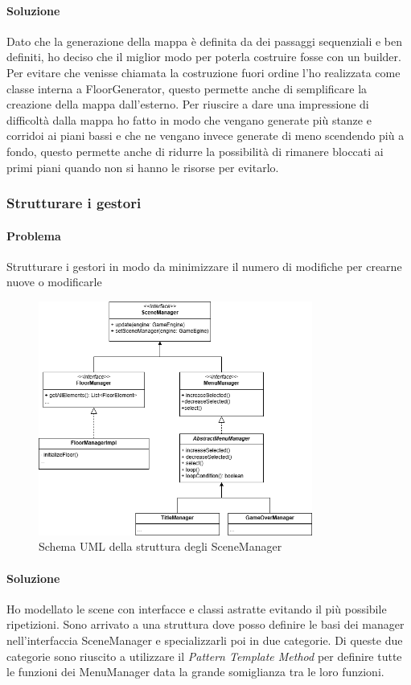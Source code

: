 \documentclass{report}
\begin{document}
\paragraph{Soluzione} Dato che la generazione della mappa è definita da dei passaggi sequenziali e ben definiti, ho deciso che il miglior modo per poterla costruire fosse con un builder.
%
Per evitare che venisse chiamata la costruzione fuori ordine l’ho realizzata come classe interna a FloorGenerator, questo permette anche di semplificare la creazione della mappa dall’esterno.
%
Per riuscire a dare una impressione di difficoltà dalla mappa ho fatto in modo che vengano generate più stanze e corridoi ai piani bassi e che ne vengano invece generate di meno scendendo più a fondo, 
%
questo permette anche di ridurre la possibilità di rimanere bloccati ai primi piani quando non si hanno le risorse per evitarlo.

\subsubsection{Strutturare i gestori}

\paragraph{Problema} Strutturare i gestori in modo da minimizzare il numero di modifiche per crearne nuove o modificarle

\begin{figure}[H]
    \centering
    \includegraphics[width=9cm]{SceneStructureDiagram.png}
    \caption{Schema UML della struttura degli SceneManager}
    \label{img:SceneStructure}
\end{figure}

\paragraph{Soluzione} Ho modellato le scene con interfacce e classi astratte evitando il più possibile ripetizioni.
%
Sono arrivato a una struttura dove posso definire le basi dei manager nell'interfaccia SceneManager e specializzarli poi in due categorie.
%
Di queste due categorie sono riuscito a utilizzare il \textit{Pattern Template Method} per definire tutte le funzioni dei MenuManager data la grande somiglianza tra le loro funzioni.
\end{document}
